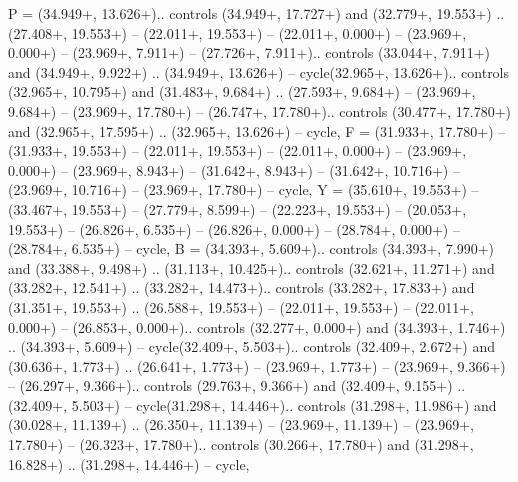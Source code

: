 {P} = {(34.949+\ctpXshift, 13.626+\ctpYshift).. controls (34.949+\ctpXshift, 17.727+\ctpYshift) and (32.779+\ctpXshift, 19.553+\ctpYshift) .. (27.408+\ctpXshift, 19.553+\ctpYshift) -- (22.011+\ctpXshift, 19.553+\ctpYshift) -- (22.011+\ctpXshift, 0.000+\ctpYshift) -- (23.969+\ctpXshift, 0.000+\ctpYshift) -- (23.969+\ctpXshift, 7.911+\ctpYshift) -- (27.726+\ctpXshift, 7.911+\ctpYshift).. controls (33.044+\ctpXshift, 7.911+\ctpYshift) and (34.949+\ctpXshift, 9.922+\ctpYshift) .. (34.949+\ctpXshift, 13.626+\ctpYshift) -- cycle(32.965+\ctpXshift, 13.626+\ctpYshift).. controls (32.965+\ctpXshift, 10.795+\ctpYshift) and (31.483+\ctpXshift, 9.684+\ctpYshift) .. (27.593+\ctpXshift, 9.684+\ctpYshift) -- (23.969+\ctpXshift, 9.684+\ctpYshift) -- (23.969+\ctpXshift, 17.780+\ctpYshift) -- (26.747+\ctpXshift, 17.780+\ctpYshift).. controls (30.477+\ctpXshift, 17.780+\ctpYshift) and (32.965+\ctpXshift, 17.595+\ctpYshift) .. (32.965+\ctpXshift, 13.626+\ctpYshift) -- cycle},
{F} = {(31.933+\ctpXshift, 17.780+\ctpYshift) -- (31.933+\ctpXshift, 19.553+\ctpYshift) -- (22.011+\ctpXshift, 19.553+\ctpYshift) -- (22.011+\ctpXshift, 0.000+\ctpYshift) -- (23.969+\ctpXshift, 0.000+\ctpYshift) -- (23.969+\ctpXshift, 8.943+\ctpYshift) -- (31.642+\ctpXshift, 8.943+\ctpYshift) -- (31.642+\ctpXshift, 10.716+\ctpYshift) -- (23.969+\ctpXshift, 10.716+\ctpYshift) -- (23.969+\ctpXshift, 17.780+\ctpYshift) -- cycle},
{Y} = {(35.610+\ctpXshift, 19.553+\ctpYshift) -- (33.467+\ctpXshift, 19.553+\ctpYshift) -- (27.779+\ctpXshift, 8.599+\ctpYshift) -- (22.223+\ctpXshift, 19.553+\ctpYshift) -- (20.053+\ctpXshift, 19.553+\ctpYshift) -- (26.826+\ctpXshift, 6.535+\ctpYshift) -- (26.826+\ctpXshift, 0.000+\ctpYshift) -- (28.784+\ctpXshift, 0.000+\ctpYshift) -- (28.784+\ctpXshift, 6.535+\ctpYshift) -- cycle},
{B} = {(34.393+\ctpXshift, 5.609+\ctpYshift).. controls (34.393+\ctpXshift, 7.990+\ctpYshift) and (33.388+\ctpXshift, 9.498+\ctpYshift) .. (31.113+\ctpXshift, 10.425+\ctpYshift).. controls (32.621+\ctpXshift, 11.271+\ctpYshift) and (33.282+\ctpXshift, 12.541+\ctpYshift) .. (33.282+\ctpXshift, 14.473+\ctpYshift).. controls (33.282+\ctpXshift, 17.833+\ctpYshift) and (31.351+\ctpXshift, 19.553+\ctpYshift) .. (26.588+\ctpXshift, 19.553+\ctpYshift) -- (22.011+\ctpXshift, 19.553+\ctpYshift) -- (22.011+\ctpXshift, 0.000+\ctpYshift) -- (26.853+\ctpXshift, 0.000+\ctpYshift).. controls (32.277+\ctpXshift, 0.000+\ctpYshift) and (34.393+\ctpXshift, 1.746+\ctpYshift) .. (34.393+\ctpXshift, 5.609+\ctpYshift) -- cycle(32.409+\ctpXshift, 5.503+\ctpYshift).. controls (32.409+\ctpXshift, 2.672+\ctpYshift) and (30.636+\ctpXshift, 1.773+\ctpYshift) .. (26.641+\ctpXshift, 1.773+\ctpYshift) -- (23.969+\ctpXshift, 1.773+\ctpYshift) -- (23.969+\ctpXshift, 9.366+\ctpYshift) -- (26.297+\ctpXshift, 9.366+\ctpYshift).. controls (29.763+\ctpXshift, 9.366+\ctpYshift) and (32.409+\ctpXshift, 9.155+\ctpYshift) .. (32.409+\ctpXshift, 5.503+\ctpYshift) -- cycle(31.298+\ctpXshift, 14.446+\ctpYshift).. controls (31.298+\ctpXshift, 11.986+\ctpYshift) and (30.028+\ctpXshift, 11.139+\ctpYshift) .. (26.350+\ctpXshift, 11.139+\ctpYshift) -- (23.969+\ctpXshift, 11.139+\ctpYshift) -- (23.969+\ctpXshift, 17.780+\ctpYshift) -- (26.323+\ctpXshift, 17.780+\ctpYshift).. controls (30.266+\ctpXshift, 17.780+\ctpYshift) and (31.298+\ctpXshift, 16.828+\ctpYshift) .. (31.298+\ctpXshift, 14.446+\ctpYshift) -- cycle},
